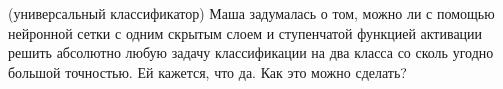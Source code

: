 \begin{problem}{(универсальный классификатор)}
Маша задумалась о том, можно ли с помощью нейронной сетки с одним скрытым слоем и ступенчатой функцией активации решить абсолютно любую задачу классификации на два класса со сколь угодно большой точностью. Ей кажется, что да. Как это можно сделать? 

\end{problem} 


